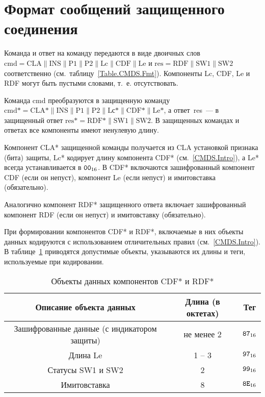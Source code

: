 \section{Формат сообщений защищенного соединения}
\label{CMDS.SM}

Команда и ответ на команду передаются в виде двоичных слов 
$\text{cmd} = \text{CLA} \parallel \text{INS} \parallel \text{P1} \parallel 
\text{P2} \parallel \text{Lc} \parallel \text{CDF} \parallel \text{Le}$ и 
$\text{res} = \text{RDF} \parallel \text{SW1} \parallel \text{SW2}$ 
соответственно (см.~таблицу~\ref{Table.CMDS.Fmt}). 
%
Компоненты Lc, CDF, Le и RDF могут быть пустыми словами, т.~е. отсутствовать.

Команда cmd преобразуются в защищенную команду 
$\text{cmd*} = \text{CLA*} \parallel \text{INS} \parallel \text{P1} 
\parallel \text{P2} \parallel \text{Lс*} \parallel \text{CDF*} 
\parallel \text{Le*}$, а ответ~res~--- в защищенный ответ 
$\text{res*} = \text{RDF*} \parallel \text{SW1} \parallel \text{SW2}$. 
%
В защищенных командах и ответах все компоненты имеют ненулевую длину. 

Компонент CLA* защищенной команды получается из CLA установкой признака 
(бита) защиты, Lc* кодирует длину компонента CDF* (см.~\ref{CMDS.Intro}), 
а Le* всегда устанавливается в $\texttt{00}_{16}$.   
%
В CDF* включаются зашифрованный компонент CDF (если он непуст), 
компонент Le (если непуст) и имитовставка (обязательно). 

Аналогично компонент RDF* защищенного ответа включает зашифрованный 
компонент RDF (если он непуст) и имитовставку (обязательно). 

При формировании компонентов CDF* и RDF*, включаемые в них объекты данных
кодируются с использованием отличительных правил (см.~\ref{CMDS.Intro}). 
В таблице~\ref{Table.CMDS.CDFRDF} приводятся допустимые объекты, 
указываются их длины и теги, используемые при кодировании. 

\begin{table}[h]
\caption{Объекты данных компонентов CDF* и RDF*}
\label{Table.CMDS.CDFRDF}
\begin{tabular}{|c|c|c|}
\hline
Описание объекта данных & Длина (в октетах) & Тег \\
\hline
\hline
Зашифрованные данные (с индикатором защиты) & не менее 2 & $\texttt{87}_{16}$ \\
\hline
Длина Le & 1 -- 3 & $\texttt{97}_{16}$\\
\hline
Статусы SW1 и SW2 & 2 & $\texttt{99}_{16}$ \\
\hline      
Имитовставка & 8 & $\texttt{8E}_{16}$ \\
\hline
\end{tabular}
\end{table}


